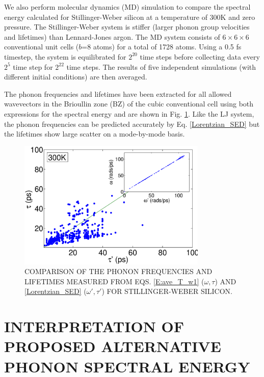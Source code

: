 \documentclass[twocolumn,10pt]{asme2e}
\begin{document}
We also perform molecular dynamics (MD) simulation to compare the spectral energy calculated for Stillinger-Weber silicon \cite{stillinger1985} at a temperature of $300$K and zero pressure. The Stillinger-Weber system is stiffer (larger phonon group velocities and lifetimes) than Lennard-Jones argon. The MD system consists
of $6\times 6\times 6$ conventional unit cells ($b$=8 atoms) for a total of 1728 atoms.
Using a 0.5 fs timestep, the system is equilibrated for $2^{20}$ time steps before collecting data every $2^5$ time step for $2^{22}$ time steps. The results of five independent simulations (with different initial conditions) are then averaged.

The phonon frequencies and lifetimes have been extracted for all allowed wavevectors in the Brioullin zone (BZ) of the cubic conventional cell using both expressions for the spectral energy and are shown in Fig. \ref{F:FREQ_LIFE_Si}. Like the LJ system, the phonon frequencies can be predicted accurately by Eq$.$ \eqref{Lorentzian_SED} but the lifetimes show large scatter on a mode-by-mode basis.

\begin{figure}
\includegraphics[angle=0,width=90.0mm]{Si_NMD_SED.eps}
\caption{\label{F:FREQ_LIFE_Si} COMPARISON OF THE PHONON FREQUENCIES AND LIFETIMES MEASURED FROM EQS$.$ \eqref{E:ave_T_w1} ($\omega,\tau$) AND  \eqref{Lorentzian_SED} ($\omega',\tau'$) FOR STILLINGER-WEBER SILICON.}
\vspace*{-5mm}
\end{figure}

\section*{INTERPRETATION OF PROPOSED ALTERNATIVE PHONON SPECTRAL ENERGY}\label{S:CNT_Case_study}
\end{document}
